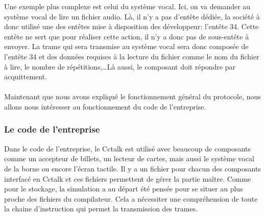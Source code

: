 \documentclass[a4paper]{article}
\begin{document}
Une exemple plus complexe est celui du système vocal. Ici, on va demander au
système vocal de lire un fichier audio. Là, il n'y a pas d'entête dédiée, la
société à donc utilisé une des entêtes mise à disposition des développeur:
l'entête 34. Cette entête ne sert que pour réaliser cette action, il n'y a donc
pas de sous-entête à envoyer. La trame qui sera transmise au système vocal sera
donc composée de l'entête 34 et des données requises à la lecture du fichier
comme le nom du fichier à lire, le nombre de répétitions,\dots Là aussi, le
composant doit répondre par acquittement.
\\~\\

Maintenant que nous avons expliqué le fonctionnement général du protocole, nous
allons nous intéresser au fonctionnement du code de l'entreprise.

\subsubsection{Le code de l'entreprise}

Dans le code de l'entreprise, le Cctalk est utilisé avec beaucoup de composants
comme un accepteur de billets, un lecteur de cartes, mais aussi le système vocal
de la borne ou encore l'écran tactile. Il y a un fichier pour chacun des
composants interfacé en Cctalk et ces fichiers permettent de gérer la partie
maître. Comme pour le stockage, la simulation a au départ été pensée pour se
situer au plus proche des fichiers du compilateur. Cela a nécessiter une
compréhension de toute la chaine d'instruction qui permet la transmission des
trames.
\end{document}
